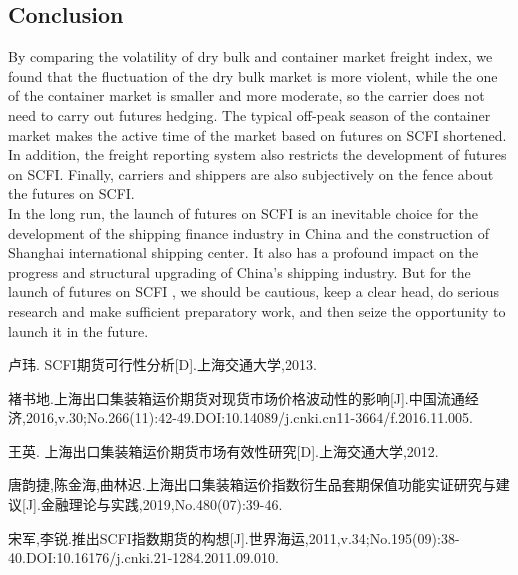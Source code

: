 \documentclass{aas}
\begin{document}
\begin{multicols}{2}
	\section{\textbf{Conclusion}}

	By comparing the volatility of dry bulk and container market freight index, we found that the fluctuation of the dry bulk market is more violent, while the one of the container market is smaller and more moderate, so the carrier does not need to carry out futures hedging. The typical off-peak season of the container market makes the active time of the market based on futures on SCFI shortened. In addition, the freight reporting system also restricts the development of futures on SCFI. Finally, carriers and shippers are also subjectively on the fence about the futures on SCFI. \\

	In the long run, the launch of futures on SCFI is an inevitable choice for the development of the shipping finance industry in China and the construction of Shanghai international shipping center. It also has a profound impact on the progress and structural upgrading of China's shipping industry. But for the launch of futures on SCFI , we should be cautious, keep a clear head, do serious research and make sufficient preparatory work, and then seize the opportunity to launch it in the future. \\

\end{multicols}

\vspace{50pt}

\begin{thebibliography}{99}
	 \addtolength{\itemsep}{0.2em} 

	 卢玮. SCFI期货可行性分析[D].上海交通大学,2013.

	 褚书地.上海出口集装箱运价期货对现货市场价格波动性的影响[J].中国流通经济,2016,v.30;No.266(11):42-49.DOI:10.14089/j.cnki.cn11-3664/f.2016.11.005.

	 王英. 上海出口集装箱运价期货市场有效性研究[D].上海交通大学,2012.

	 唐韵捷,陈金海,曲林迟.上海出口集装箱运价指数衍生品套期保值功能实证研究与建议[J].金融理论与实践,2019,No.480(07):39-46.

	 宋军,李锐.推出SCFI指数期货的构想[J].世界海运,2011,v.34;No.195(09):38-40.DOI:10.16176/j.cnki.21-1284.2011.09.010.
\end{thebibliography}
\end{document}
